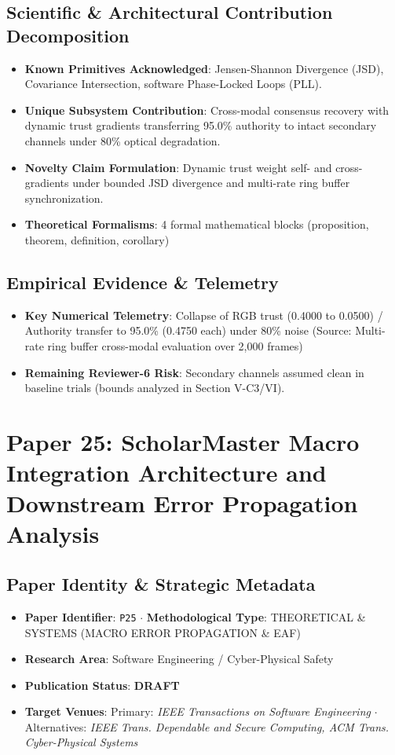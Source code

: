 \documentclass[11pt,a4paper]{article}
\begin{document}
\subsection*{Scientific & Architectural Contribution Decomposition}
\begin{itemize}[leftmargin=1.5em, itemsep=0.2em]
    \item \textbf{Known Primitives Acknowledged}: Jensen-Shannon Divergence (JSD), Covariance Intersection, software Phase-Locked Loops (PLL).
    \item \textbf{Unique Subsystem Contribution}: Cross-modal consensus recovery with dynamic trust gradients transferring 95.0\% authority to intact secondary channels under 80\% optical degradation.
    \item \textbf{Novelty Claim Formulation}: Dynamic trust weight self- and cross-gradients under bounded JSD divergence and multi-rate ring buffer synchronization.
    \item \textbf{Theoretical Formalisms}: 4 formal mathematical blocks (proposition, theorem, definition, corollary)
\end{itemize}

\subsection*{Empirical Evidence & Telemetry}
\begin{itemize}[leftmargin=1.5em, itemsep=0.2em]
    \item \textbf{Key Numerical Telemetry}: Collapse of RGB trust (0.4000 to 0.0500) / Authority transfer to 95.0\% (0.4750 each) under 80\% noise (Source: Multi-rate ring buffer cross-modal evaluation over 2,000 frames)
    \item \textbf{Remaining Reviewer-6 Risk}: Secondary channels assumed clean in baseline trials (bounds analyzed in Section V-C3/VI).
\end{itemize}

\section{Paper 25: ScholarMaster Macro Integration Architecture and Downstream Error Propagation Analysis}

\subsection*{Paper Identity \& Strategic Metadata}
\begin{itemize}[leftmargin=1.5em, itemsep=0.2em]
    \item \textbf{Paper Identifier}: \texttt{P25} $\cdot$ \textbf{Methodological Type}: THEORETICAL \& SYSTEMS (MACRO ERROR PROPAGATION \& EAF)
    \item \textbf{Research Area}: Software Engineering / Cyber-Physical Safety
    \item \textbf{Publication Status}: \textbf{DRAFT}
    \item \textbf{Target Venues}: Primary: \textit{IEEE Transactions on Software Engineering} $\cdot$ Alternatives: \textit{IEEE Trans. Dependable and Secure Computing, ACM Trans. Cyber-Physical Systems}
\end{itemize}
\end{document}
